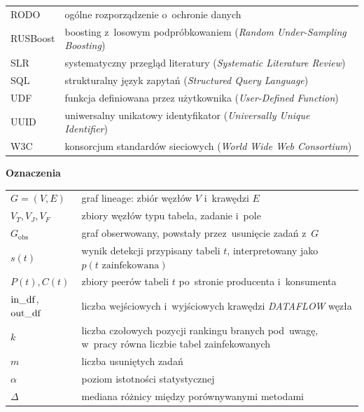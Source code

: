 \documentclass[polish,master,a4paper,oneside]{ppfcmthesis}
\renewcommand{\_}{\origtextunderscore\ifmmode\else\allowbreak\fi}
\begin{document}
\begin{tabularx}{\textwidth}{@{}lX@{}}
RODO      & ogólne rozporządzenie o~ochronie danych \\
RUSBoost  & boosting z~losowym podpróbkowaniem (\emph{Random Under-Sampling
             Boosting}) \\
SLR       & systematyczny przegląd literatury (\emph{Systematic Literature
             Review}) \\
SQL       & strukturalny język zapytań (\emph{Structured Query Language}) \\
UDF       & funkcja definiowana przez użytkownika (\emph{User-Defined
             Function}) \\
UUID      & uniwersalny unikatowy identyfikator (\emph{Universally Unique
             Identifier}) \\
W3C       & konsorcjum standardów sieciowych (\emph{World Wide Web
             Consortium}) \\
\end{tabularx}

\vspace{1.5em}
\noindent\textbf{Oznaczenia}
\vspace{0.5em}
\nopagebreak

\noindent\begin{tabularx}{\textwidth}{@{}lX@{}}
$G = (V, E)$ & graf lineage: zbiór węzłów $V$ i~krawędzi $E$ \\
$V_{T}, V_{J}, V_{F}$ & zbiory węzłów typu tabela, zadanie i~pole \\
$G_{\mathrm{obs}}$ & graf obserwowany, powstały przez~usunięcie zadań z~$G$ \\
$s(t)$    & wynik detekcji przypisany tabeli $t$, interpretowany
             jako~$p(\text{$t$ zainfekowana})$ \\
$P(t), C(t)$ & zbiory peerów tabeli $t$ po~stronie producenta i~konsumenta \\
$\mathrm{in\_df}$, $\mathrm{out\_df}$ & liczba wejściowych i~wyjściowych
             krawędzi \emph{DATA\_FLOW} węzła \\
$k$       & liczba czołowych pozycji rankingu branych pod~uwagę,
             w~pracy równa liczbie tabel zainfekowanych \\
$m$       & liczba usuniętych zadań \\
$\alpha$  & poziom istotności statystycznej \\
$\Delta$  & mediana różnicy między porównywanymi metodami \\
\end{tabularx}
\end{document}
